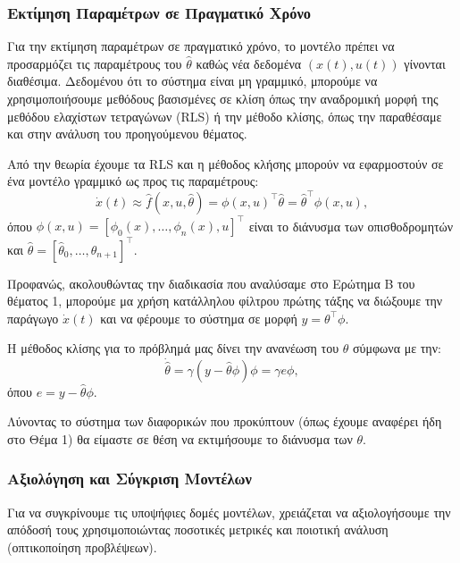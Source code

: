 \documentclass[12pt]{article} %
\numberwithin{equation}{section}  %
\begin{document}
\subsubsection{Εκτίμηση Παραμέτρων σε Πραγματικό Χρόνο}

Για την εκτίμηση παραμέτρων σε πραγματικό χρόνο, το μοντέλο πρέπει να προσαρμόζει τις παραμέτρους του \(\hat{\theta}\) καθώς νέα δεδομένα \((x(t), u(t))\) γίνονται διαθέσιμα. 
Δεδομένου ότι το σύστημα είναι μη γραμμικό, μπορούμε να χρησιμοποιήσουμε μεθόδους βασισμένες σε κλίση όπως την αναδρομική μορφή της μεθόδου ελαχίστων τετραγώνων (RLS) ή την μέθοδο κλίσης, όπως την παραθέσαμε και στην ανάλυση του προηγούμενου θέματος.

Από την θεωρία έχουμε τα RLS και η μέθοδος κλήσης μπορούν να εφαρμοστούν σε ένα μοντέλο γραμμικό ως προς τις παραμέτρους:
\[
\dot{x}(t) \approx \hat{f}(x, u, \hat{\theta}) = \phi(x, u)^{\top} \hat{\theta} = \hat{\theta}^{\top} \phi(x, u),
\]
όπου \(\phi(x, u) = [\phi_0(x), \dots, \phi_n(x), u]^{\top}\) είναι το διάνυσμα των οπισθοδρομητών και \(\hat{\theta} = [\hat{\theta}_0, \dots, \hat{\theta}_{n+1}]^{\top}\). 

Προφανώς, ακολουθώντας την διαδικασία που αναλύσαμε στο Ερώτημα Β του θέματος 1, μπορούμε μα χρήση κατάλληλου φίλτρου πρώτης τάξης να διώξουμε την παράγωγο $\dot{x}(t)$ και να φέρουμε το σύστημα σε μορφή $y = \theta^{\top} \phi$.

H μέθοδος κλίσης για το πρόβλημά μας δίνει την ανανέωση του $\theta$ σύμφωνα με την:
\[
\dot{\hat{\theta}} = \gamma (y - \hat\theta \phi) \phi = \gamma e \phi,
\]
όπου \(e =  y - \hat\theta \phi\).

Λύνοντας το σύστημα των διαφορικών που προκύπτουν (όπως έχουμε αναφέρει ήδη στο Θέμα 1) θα είμαστε σε θέση να εκτιμήσουμε το διάνυσμα των $\theta$.

\subsubsection{Αξιολόγηση και Σύγκριση Μοντέλων}
Για να συγκρίνουμε τις υποψήφιες δομές μοντέλων, χρειάζεται να αξιολογήσουμε την απόδοσή τους χρησιμοποιώντας ποσοτικές μετρικές και ποιοτική ανάλυση (οπτικοποίηση προβλέψεων).
\end{document}
